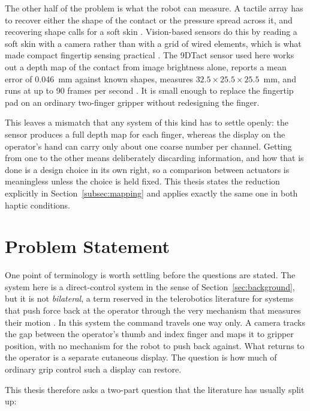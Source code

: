 \documentclass[12pt, a4paper, twoside, openright]{report}
\begin{document}
The other half of the problem is what the robot can measure. A tactile array
has to recover either the shape of the contact or the pressure spread across
it, and recovering shape calls for a soft skin \cite{cutkosky2016,howe1992}.
Vision-based sensors do this by reading a soft skin with a camera rather than
with a grid of wired elements, which is what made compact fingertip sensing
practical \cite{li2024}. The 9DTact sensor used here works out a depth map of
the contact from image brightness alone, reports a mean error of
\SI{0.046}{\milli\metre} against known shapes, measures
$32.5 \times 25.5 \times 25.5$~\si{\milli\metre}, and runs at up to 90 frames
per second \cite{lin2023}. It is small enough to replace the fingertip pad on
an ordinary two-finger gripper without redesigning the finger.

This leaves a mismatch that any system of this kind has to settle openly:
the sensor produces a full depth map for each finger, whereas the display on
the operator's hand can carry only about one coarse number per channel. Getting
from one to the other means deliberately discarding information, and how that
is done is a design choice in its own right, so a comparison between actuators
is meaningless unless the choice is held fixed. This thesis states the
reduction explicitly in Section~\ref{subsec:mapping} and applies exactly the
same one in both haptic conditions.

\section{Problem Statement}
\label{sec:problem-statement}

One point of terminology is worth settling before the questions are stated. The
system here is a direct-control system in the sense of
Section~\ref{sec:background}, but it is not \emph{bilateral}, a term reserved
in the telerobotics literature for systems that push force back at the operator
through the very mechanism that measures their motion \cite{niemeyer2016}. In
this system the command travels one way only. A camera tracks the gap between
the operator's thumb and index finger and maps it to gripper position, with no
mechanism for the robot to push back against. What returns to the operator is a
separate cutaneous display. The question is how much of ordinary grip control
such a display can restore.

This thesis therefore asks a two-part question that the literature has usually
split up:
\end{document}
